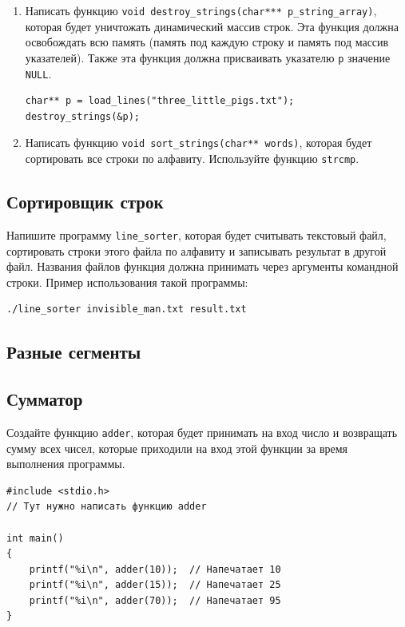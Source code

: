 \documentclass{article}
\begin{document}
\begin{enumerate}
\item Написать функцию \texttt{void destroy\_strings(char*** p\_string\_array)}, которая будет уничтожать динамический массив строк. Эта функция должна освобождать всю память (память под каждую строку и память под массив указателей). Также эта функция должна присваивать указателю \texttt{p} значение \texttt{NULL}.
\begin{lstlisting}
char** p = load_lines("three_little_pigs.txt");
destroy_strings(&p);
\end{lstlisting}

\item Написать функцию \texttt{void sort\_strings(char** words)}, которая будет сортировать все строки по алфавиту. Используйте функцию \texttt{strcmp}.
\end{enumerate}

\subsection{Сортировщик строк}
Напишите программу \texttt{line\_sorter}, которая будет считывать текстовый файл, сортировать строки этого файла по алфавиту и записывать результат в другой файл. Названия файлов функция должна принимать через аргументы командной строки.
Пример использования такой программы:

\begin{verbatim}
./line_sorter invisible_man.txt result.txt
\end{verbatim}



\subsection{Разные сегменты}



\subsection{Сумматор}
Создайте функцию \texttt{adder}, которая будет принимать на вход число и возвращать сумму всех чисел, которые приходили на вход этой функции за время выполнения программы.
\begin{lstlisting}
#include <stdio.h>
// Тут нужно написать функцию adder

int main()
{
    printf("%i\n", adder(10));  // Напечатает 10
    printf("%i\n", adder(15));  // Напечатает 25
    printf("%i\n", adder(70));  // Напечатает 95
}
\end{lstlisting}
\end{document}
